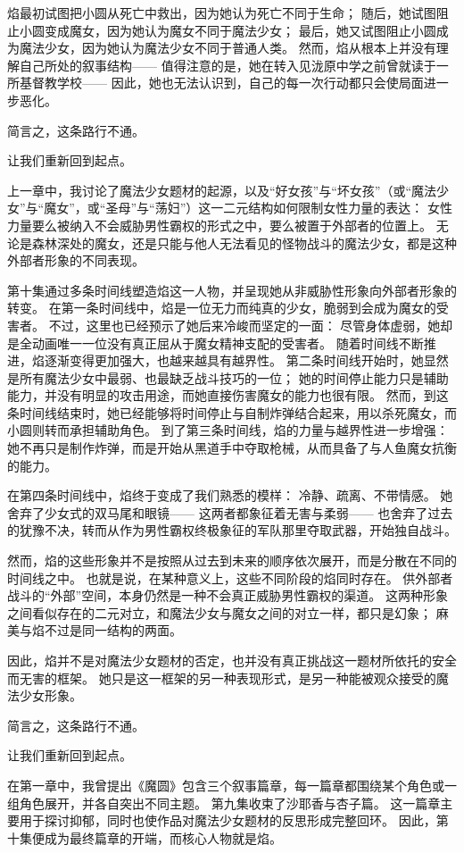 焰最初试图把小圆从死亡中救出，因为她认为死亡不同于生命；
随后，她试图阻止小圆变成魔女，因为她认为魔女不同于魔法少女；
最后，她又试图阻止小圆成为魔法少女，因为她认为魔法少女不同于普通人类。
然而，焰从根本上并没有理解自己所处的叙事结构——
值得注意的是，她在转入见泷原中学之前曾就读于一所基督教学校——
因此，她也无法认识到，自己的每一次行动都只会使局面进一步恶化。

简言之，这条路行不通。

让我们重新回到起点。

上一章中，我讨论了魔法少女题材的起源，以及“好女孩”与“坏女孩”（或“魔法少女”与“魔女”，或“圣母”与“荡妇”）这一二元结构如何限制女性力量的表达：
女性力量要么被纳入不会威胁男性霸权的形式之中，要么被置于外部者的位置上。
无论是森林深处的魔女，还是只能与他人无法看见的怪物战斗的魔法少女，都是这种外部者形象的不同表现。

第十集通过多条时间线塑造焰这一人物，并呈现她从非威胁性形象向外部者形象的转变。
在第一条时间线中，焰是一位无力而纯真的少女，脆弱到会成为魔女的受害者。
不过，这里也已经预示了她后来冷峻而坚定的一面：
尽管身体虚弱，她却是全动画唯一一位没有真正屈从于魔女精神支配的受害者。
随着时间线不断推进，焰逐渐变得更加强大，也越来越具有越界性。
第二条时间线开始时，她显然是所有魔法少女中最弱、也最缺乏战斗技巧的一位；
她的时间停止能力只是辅助能力，并没有明显的攻击用途，而她直接伤害魔女的能力也很有限。
然而，到这条时间线结束时，她已经能够将时间停止与自制炸弹结合起来，用以杀死魔女，而小圆则转而承担辅助角色。
到了第三条时间线，焰的力量与越界性进一步增强：
她不再只是制作炸弹，而是开始从黑道手中夺取枪械，从而具备了与人鱼魔女抗衡的能力。

在第四条时间线中，焰终于变成了我们熟悉的模样：
冷静、疏离、不带情感。
她舍弃了少女式的双马尾和眼镜——
这两者都象征着无害与柔弱——
也舍弃了过去的犹豫不决，转而从作为男性霸权终极象征的军队那里夺取武器，开始独自战斗。

然而，焰的这些形象并不是按照从过去到未来的顺序依次展开，而是分散在不同的时间线之中。
也就是说，在某种意义上，这些不同阶段的焰同时存在。
供外部者战斗的“外部”空间，本身仍然是一种不会真正威胁男性霸权的渠道。
这两种形象之间看似存在的二元对立，和魔法少女与魔女之间的对立一样，都只是幻象；
麻美与焰不过是同一结构的两面。

因此，焰并不是对魔法少女题材的否定，也并没有真正挑战这一题材所依托的安全而无害的框架。
她只是这一框架的另一种表现形式，是另一种能被观众接受的魔法少女形象。

简言之，这条路行不通。

让我们重新回到起点。

在第一章中，我曾提出《魔圆》包含三个叙事篇章，每一篇章都围绕某个角色或一组角色展开，并各自突出不同主题。
第九集收束了沙耶香与杏子篇。
这一篇章主要用于探讨抑郁，同时也使作品对魔法少女题材的反思形成完整回环。
因此，第十集便成为最终篇章的开端，而核心人物就是焰。

